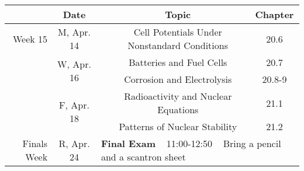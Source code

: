 \documentclass[12pt, letterpaper]{article}
\begin{document}
\begin{tabular}{rcccc}
& Date && Topic & Chapter\\
\midrule
Week 15 & M, Apr. 14&& Cell Potentials Under Nonstandard Conditions & 20.6\\
& \multirow{2}{*}{W, Apr. 16}& & Batteries and Fuel Cells & 20.7\\
& & & Corrosion and Electrolysis & 20.8-9\\
& \multirow{2}{*}{F, Apr. 18}& & Radioactivity and Nuclear Equations & 21.1\\
& & & Patterns of Nuclear Stability & 21.2\\
\midrule
\midrule
Finals Week & R, Apr. 24 & \multicolumn{3}{l}{\textbf{Final Exam} ~ 11:00-12:50 ~ Bring a pencil and a scantron sheet}\\
\end{tabular}
\end{document}
